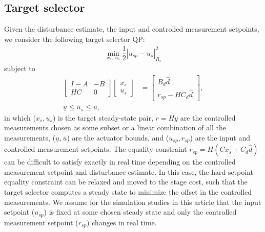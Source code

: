 \documentclass[preprint,5p, twocolumn, authoryear]{elsarticle}
\newcommand{\dhat}{\hat{d}}
\begin{document}
\subsection{Target selector}
Given the disturbance estimate, the input and controlled measurement setpoints,
we consider the following target selector QP:
\begin{align}
    \min_{x_s, \ u_s}  \dfrac{1}{2} |u_{sp} - u_s|^2_{R_s}
\end{align}
subject to
\begin{align}  
    \begin{bmatrix}
        I -A & -B \\
        HC & 0
    \end{bmatrix} \begin{bmatrix}
        x_s \\
        u_s
    \end{bmatrix} &= \begin{bmatrix}
        B_d\dhat \\
        r_{sp} - HC_d\dhat
    \end{bmatrix}, \\
    \underline{u} \leq u_s \leq \overline{u},
\end{align}
in which ($x_s, u_s$) is the target steady-state pair, $r=Hy$ are the controlled
measurements chosen as some subset or a linear combination of all the
measurements, ($\underline{u}, \overline{u}$) are the actuator bounds, and
($u_{sp}, r_{sp}$) are the input and controlled measurement setpoints. The
equality constraint $r_{sp} = H(Cx_s + C_d\dhat)$ can be difficult to satisfy
exactly in real time depending on the controlled measurement setpoint and
disturbance estimate. In this case, the hard setpoint equality constraint can be
relaxed and moved to the stage cost, such that the target selector computes a
steady state to minimize the offset in the controlled measurements. We assume
for the simulation studies in this article that the input setpoint ($u_{sp}$) is
fixed at some chosen steady state and only the controlled measurement setpoint
($r_{sp}$) changes in real time.
\end{document}
